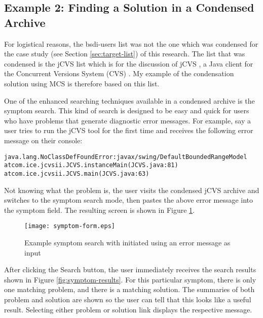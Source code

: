 \subsection{Example 2: Finding a Solution in a Condensed Archive}
\label{sec:mcs-symptom-example}
For logistical reasons, the bsdi-users list was not the one which was condensed
for the case study (see Section \ref{sec:target-list}) of this research. The
list that was condensed is the jCVS list \cite{jcvs-list} which is for the
discussion of jCVS \cite{jcvs-program}, a Java client for the Concurrent
Versions System (CVS) \cite{cvs-program}. My example of the condensation
solution using MCS is therefore based on this list.

One of the enhanced searching techniques available in a condensed archive is
the symptom search. This kind of search is designed to be easy and quick for
users who have problems that generate diagnostic error messages. For example,
say a user tries to run the jCVS tool for the first time and receives the
following error message on their console:

\begin{alltt}
{\small{}java.lang.NoClassDefFoundError: javax/swing/DefaultBoundedRangeModel
        at com.ice.jcvsii.JCVS.instanceMain(JCVS.java:81)
        at com.ice.jcvsii.JCVS.main(JCVS.java:63)}
\end{alltt}

Not knowing what the problem is, the user visits the condensed jCVS archive and
switches to the symptom search mode, then pastes the above error message into
the symptom field. The resulting screen is shown in Figure
\ref{fig:symptom-form}.

\begin{figure}[htbp]
  \centering
  \texttt{[image: symptom-form.eps]}
  \caption{Example symptom search with initiated using an error message as input}
  \label{fig:symptom-form}
\end{figure}

After clicking the Search button, the user immediately receives the search
results shown in Figure \ref{fig:symptom-results}. For this particular symptom,
there is only one matching problem, and there is a matching solution. The
summaries of both problem and solution are shown so the user can tell that this
looks like a useful result. Selecting either problem or solution link displays
the respective message.

